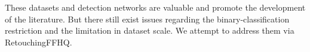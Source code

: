 \documentclass[sigconf]{acmart}
\begin{document}

These datasets and detection networks are valuable and promote the development of the literature.
But there still exist issues regarding the binary-classification restriction and the limitation in dataset scale.
We attempt to address them via RetouchingFFHQ.
\end{document}
